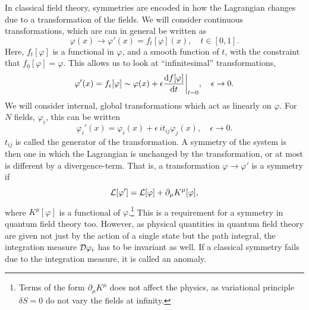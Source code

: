 In classical field theory, symmetries are encoded in how the Lagrangian changes due to a transformation of the fields.
We will consider continuous transformations, which are can in general be written as
\begin{equation}
    \varphi(x) \longrightarrow \varphi'(x) = f_t[\varphi](x), \quad t \in [0, 1].
\end{equation}
Here, $f_t[\varphi]$ is a functional in $\varphi$, and a smooth function of $t$, with the constraint that $f_0[\varphi] = \varphi$.
This allows us to look at ``infinitesimal'' transformations,
\begin{equation}
    \label{infinitesimal transformation}
    \varphi'(x) = f_\epsilon[\varphi] \sim \varphi(x) + \epsilon\diff{f[\varphi]}{t}\bigg |_{t=0}, \quad \epsilon \rightarrow 0.
\end{equation}
We will consider internal, global transformations which act as linearly on $\varphi$.
For $N$ fields, $\varphi_i$, this can be written
\begin{equation}
    \label{linear field transformation}
    \varphi_i'(x) = \varphi_i(x) + \epsilon \, i t_{ij} \varphi_j(x), \quad \epsilon \rightarrow 0.
\end{equation}
$t_{ij}$ is called the generator of the transformation.
A symmetry of the system is then one in which the Lagrangian is unchanged by the transformation, or at most is different by a divergence-term.
That is, a transformation $\varphi \rightarrow \varphi'$ is a symmetry if 
\begin{equation}
    \mathcal{L}[\varphi'] = \mathcal{L}[\varphi] + \partial_\mu K^\mu[\varphi],
\end{equation}
where $K^\mu[\varphi]$ is a functional of $\varphi$.\footnote{Terms of the form $\partial_\mu K^\mu$ does not affect the physics, as variational principle $\delta S = 0$ do not vary the fields at infinity.}
This is a requirement for a symmetry in quantum field theory too.
However, as physical quantities in quantum field theory are given not just by the action of a single state but the path integral, the integration measure $\mathcal{D} \varphi_i$ has to be invariant as well.
If a classical symmetry fails due to the integration measure, it is called an anomaly.

